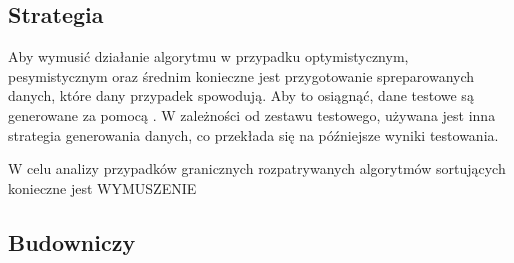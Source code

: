 \begin{figure}[H]
	\centering
	
\end{figure}

\subsection{Strategia}
Aby wymusić działanie algorytmu w przypadku optymistycznym, pesymistycznym oraz średnim konieczne jest przygotowanie
spreparowanych danych, które dany przypadek spowodują. Aby to osiągnąć, dane testowe są generowane za pomocą . W zależności od zestawu testowego, używana jest inna strategia generowania danych, co przekłada się na późniejsze wyniki testowania.

\begin{figure}[H]
	\centering
	
\end{figure}

W celu analizy przypadków granicznych rozpatrywanych algorytmów sortujących konieczne jest WYMUSZENIE

\subsection{Budowniczy}


